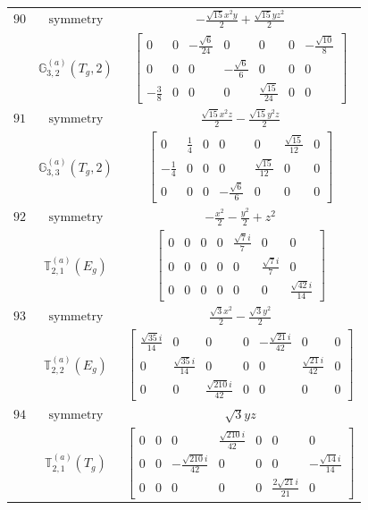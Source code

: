 \documentclass[fleqn,8pt,landscape]{jsarticle}
\begin{document}
\begin{longtable}{ccc}
$ 90 $ & $ \text{symmetry} $ & $ - \frac{\sqrt{15} x^{2} y}{2} + \frac{\sqrt{15} y z^{2}}{2} $ \\
$  $ & $ \mathbb{G}_{3,2}^{(a)}(T_{g},2) $ & $ \begin{bmatrix} 0 & 0 & - \frac{\sqrt{6}}{24} & 0 & 0 & 0 & - \frac{\sqrt{10}}{8} \\ 0 & 0 & 0 & - \frac{\sqrt{6}}{6} & 0 & 0 & 0 \\ - \frac{3}{8} & 0 & 0 & 0 & \frac{\sqrt{15}}{24} & 0 & 0 \end{bmatrix} $ \\ \hline
$ 91 $ & $ \text{symmetry} $ & $ \frac{\sqrt{15} x^{2} z}{2} - \frac{\sqrt{15} y^{2} z}{2} $ \\
$  $ & $ \mathbb{G}_{3,3}^{(a)}(T_{g},2) $ & $ \begin{bmatrix} 0 & \frac{1}{4} & 0 & 0 & 0 & \frac{\sqrt{15}}{12} & 0 \\ - \frac{1}{4} & 0 & 0 & 0 & \frac{\sqrt{15}}{12} & 0 & 0 \\ 0 & 0 & 0 & - \frac{\sqrt{6}}{6} & 0 & 0 & 0 \end{bmatrix} $ \\ \hline
$ 92 $ & $ \text{symmetry} $ & $ - \frac{x^{2}}{2} - \frac{y^{2}}{2} + z^{2} $ \\
$  $ & $ \mathbb{T}_{2,1}^{(a)}(E_{g}) $ & $ \begin{bmatrix} 0 & 0 & 0 & 0 & \frac{\sqrt{7} i}{7} & 0 & 0 \\ 0 & 0 & 0 & 0 & 0 & \frac{\sqrt{7} i}{7} & 0 \\ 0 & 0 & 0 & 0 & 0 & 0 & \frac{\sqrt{42} i}{14} \end{bmatrix} $ \\ \hline
$ 93 $ & $ \text{symmetry} $ & $ \frac{\sqrt{3} x^{2}}{2} - \frac{\sqrt{3} y^{2}}{2} $ \\
$  $ & $ \mathbb{T}_{2,2}^{(a)}(E_{g}) $ & $ \begin{bmatrix} \frac{\sqrt{35} i}{14} & 0 & 0 & 0 & - \frac{\sqrt{21} i}{42} & 0 & 0 \\ 0 & \frac{\sqrt{35} i}{14} & 0 & 0 & 0 & \frac{\sqrt{21} i}{42} & 0 \\ 0 & 0 & \frac{\sqrt{210} i}{42} & 0 & 0 & 0 & 0 \end{bmatrix} $ \\ \hline
$ 94 $ & $ \text{symmetry} $ & $ \sqrt{3} y z $ \\
$  $ & $ \mathbb{T}_{2,1}^{(a)}(T_{g}) $ & $ \begin{bmatrix} 0 & 0 & 0 & \frac{\sqrt{210} i}{42} & 0 & 0 & 0 \\ 0 & 0 & - \frac{\sqrt{210} i}{42} & 0 & 0 & 0 & - \frac{\sqrt{14} i}{14} \\ 0 & 0 & 0 & 0 & 0 & \frac{2 \sqrt{21} i}{21} & 0 \end{bmatrix} $ \\ \hline

\end{longtable}
\end{document}
